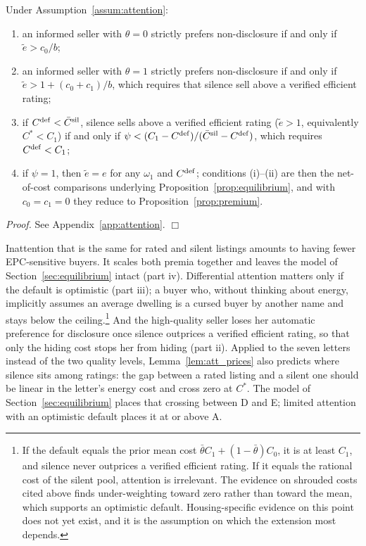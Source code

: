 \begin{proposition}
\label{prop:att_incentives}
Under Assumption~\ref{assum:attention}:
\begin{enumerate}[label=(\roman*)]
    \item an informed seller with $\theta=0$ strictly prefers non-disclosure if and only if $\tilde e>c_0/b$;
    \item an informed seller with $\theta=1$ strictly prefers non-disclosure if and only if $\tilde e>1+(c_0+c_1)/b$, which requires that silence sell above a verified efficient rating;
    \item if $C^{\rm def}<\bar C^{\rm sil}$, silence sells above a verified efficient rating ($\tilde e>1$, equivalently $C^*<C_1$) if and only if $\psi<(C_1-C^{\rm def})/(\bar C^{\rm sil}-C^{\rm def})$, which requires $C^{\rm def}<C_1$;
    \item if $\psi=1$, then $\tilde e=e$ for any $\omega_1$ and $C^{\rm def}$; conditions (i)--(ii) are then the net-of-cost comparisons underlying Proposition~\ref{prop:equilibrium}, and with $c_0=c_1=0$ they reduce to Proposition~\ref{prop:premium}.
\end{enumerate}
\end{proposition}

\noindent\textit{Proof.} See Appendix~\ref{app:attention}. $\Box$

Inattention that is the same for rated and silent listings amounts to having fewer EPC-sensitive buyers. It scales both premia together and leaves the model of Section~\ref{sec:equilibrium} intact (part iv). Differential attention matters only if the default is optimistic (part iii); a buyer who, without thinking about energy, implicitly assumes an average dwelling is a cursed buyer by another name and stays below the ceiling.\footnote{If the default equals the prior mean cost $\bar\theta C_1+(1-\bar\theta)C_0$, it is at least $C_1$, and silence never outprices a verified efficient rating. If it equals the rational cost of the silent pool, attention is irrelevant. The evidence on shrouded costs cited above finds under-weighting toward zero rather than toward the mean, which supports an optimistic default. Housing-specific evidence on this point does not yet exist, and it is the assumption on which the extension most depends.} And the high-quality seller loses her automatic preference for disclosure once silence outprices a verified efficient rating, so that only the hiding cost stops her from hiding (part ii). Applied to the seven letters instead of the two quality levels, Lemma~\ref{lem:att_prices} also predicts where silence sits among ratings: the gap between a rated listing and a silent one should be linear in the letter's energy cost and cross zero at $C^*$. The model of Section~\ref{sec:equilibrium} places that crossing between D and E; limited attention with an optimistic default places it at or above A.

